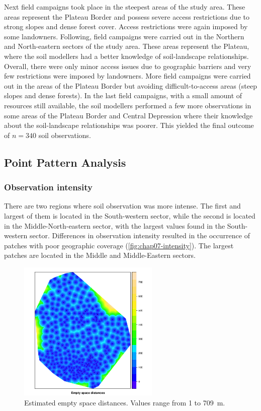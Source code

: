 Next field campaigns took place in the steepest areas of the study area. These areas represent the Plateau 
Border and possess severe access restrictions due to strong slopes and dense forest cover. Access restrictions 
were again imposed by some landowners. Following, field campaigns were carried out in the Northern and 
North-eastern sectors of the study area. These areas represent the Plateau, where the soil modellers had a 
better knowledge of soil-landscape relationships. Overall, there were only minor access issues due to 
geographic barriers and very few restrictions were imposed by landowners. More field campaigns were carried 
out in the areas of the Plateau Border but avoiding difficult-to-access areas (steep slopes and dense forests).
In the last field campaigns, with a small amount of resources still available, the soil modellers performed a 
few more observations in some areas of the Plateau Border and Central Depression where their knowledge about 
the soil-landscape relationships was poorer. This yielded the final outcome of $n = 340$ soil observations.

\subsection{Point Pattern Analysis}

\subsubsection{Observation intensity}

There are two regions where soil observation was more intense. The first and largest of them is located in the 
South-western sector, while the second is located in the Middle-North-eastern sector, with the largest values 
found in the South-western sector. Differences in observation intensity resulted in the occurrence of patches 
with poor geographic coverage (\autoref{fig:chap07-intensity}). The largest patches are located in the 
Middle and Middle-Eastern sectors.

\begin{figure}[!ht]
\centering
\includegraphics[width=0.6\textwidth]{fig/chap07-empty-space}
\caption[Estimated empty space distances.]{Estimated empty space distances. Values range from \num{1} to 
\SI{709}{\m}.}
\label{fig:chap07-intensity}
\end{figure}

